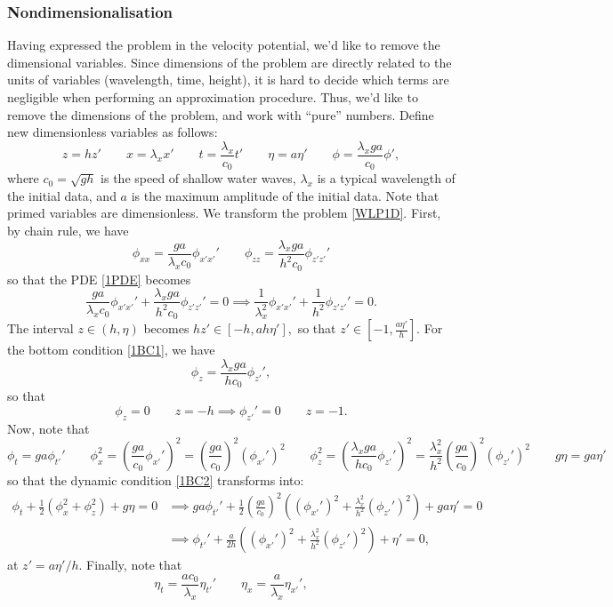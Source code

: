 \documentclass[10pt,reqno,oneside,a4paper]{article}
\begin{document}
\subsubsection{Nondimensionalisation}
Having expressed the problem in the velocity potential, we'd like to remove the dimensional variables. Since dimensions of the problem are directly related to the units of variables (wavelength, time, height), it is hard to decide which terms are negligible when performing an approximation procedure. Thus, we'd like to remove the dimensions of the problem, and work with ``pure'' numbers.  Define new dimensionless variables as follows:
\[ 
z = h z' \qquad x = \lambda_x x' \qquad t = \frac{\lambda_x}{c_0} t' \qquad \eta = a \eta' \qquad \phi  = \frac{\lambda_x ga}{c_0} \phi',
\]
where $c_0 = \sqrt{gh}$ is the speed of shallow water waves, $\lambda_x$ is a typical wavelength of the initial data, and $a$ is the maximum amplitude of the initial data. Note that primed variables are dimensionless. We transform the problem \eqref{WLP1D}.
First, by chain rule, we have
\[ 
\phi_{xx} = \frac{ga}{\lambda_x c_0} \phi_{x'x'}' \qquad \phi_{zz} = \frac{\lambda_x ga}{h^2c_0} \phi_{z'z'}'\] 
so that the PDE \eqref{1PDE} becomes
\[\frac{ga}{\lambda_x c_0} \phi_{x'x'}' + \frac{\lambda_x ga}{h^2c_0} \phi_{z'z'}' = 0 \implies \frac{1}{\lambda_x^2} \phi_{x'x'}' + \frac{1}{h^2} \phi_{z'z'}' = 0.
\]
The interval $z \in (h, \eta)$ becomes $hz' \in [-h, a h \eta'],$ so that $z' \in [-1, \frac{a \eta'}{h}].$ For the bottom condition \eqref{1BC1}, we have
\[ 
\phi_z =  \frac{\lambda_x ga}{h c_0} \phi_{z'}',
\]
so that 
\[ \phi_z = 0 \qquad z = - h \implies \phi_{z'}' = 0 \qquad z = -1. \]
Now, note that 
\[ 
\phi_t = ga \phi_{t'}' \qquad \phi_x^2 = \left(\frac{ga}{c_0} \phi_{x'}'\right)^2 = \left(\frac{ga}{c_0}\right)^2 \left(\phi_{x'}'\right)^2 \qquad \phi_z^2 = \left(\frac{\lambda_x ga}{hc_0}\phi_{z'}'\right)^2 = \frac{\lambda_x^2}{h^2}\left(\frac{ga}{c_0}\right)^2\left(\phi_{z'}'\right)^2 \qquad g\eta = ga\eta'
\]
so that the dynamic condition \eqref{1BC2} transforms into:
\begin{align*}
\phi_t + \frac{1}{2} (\phi_{x}^2 + \phi_{z}^2) + g \eta = 0 &\implies ga \phi_{t'}' + \frac{1}{2}\left(\frac{ga}{c_0}\right)^2 \left((\phi_{x'}')^2 + \frac{\lambda_x^2}{h^2}(\phi_{z'}')^2\right) + ga \eta' = 0 \\
&\implies \phi_{t'}' + \frac{a}{2h} \left((\phi_{x'}')^2 + \frac{\lambda_x^2}{h^2}(\phi_{z'}')^2\right) + \eta' = 0,
\end{align*}
at $z' = a\eta'/h.$ Finally, note that 
\[ 
\eta_t = \frac{ac_0}{\lambda_x}\eta_{t'}' \qquad \eta_x = \frac{a}{\lambda_x}\eta_{x'}',
\]
\end{document}
